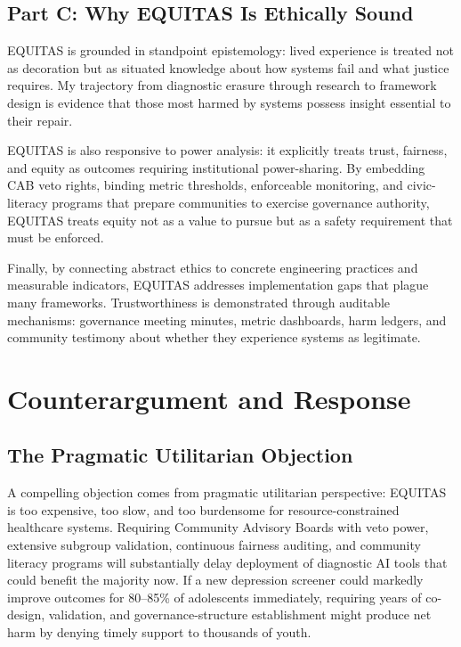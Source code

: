 \documentclass[12pt,a4paper]{article}
\begin{document}
\subsection{Part C: Why EQUITAS Is Ethically Sound}

EQUITAS is grounded in standpoint epistemology: lived experience is treated not as decoration but as situated knowledge about how systems fail and what justice requires.\cite{garcia_ed415} My trajectory from diagnostic erasure through research to framework design is evidence that those most harmed by systems possess insight essential to their repair.

EQUITAS is also responsive to power analysis: it explicitly treats trust, fairness, and equity as outcomes requiring institutional power-sharing.\cite{garcia_ed415} By embedding CAB veto rights, binding metric thresholds, enforceable monitoring, and civic-literacy programs that prepare communities to exercise governance authority, EQUITAS treats equity not as a value to pursue but as a safety requirement that must be enforced.\cite{lekadir2025}

Finally, by connecting abstract ethics to concrete engineering practices and measurable indicators, EQUITAS addresses implementation gaps that plague many frameworks. Trustworthiness is demonstrated through auditable mechanisms: governance meeting minutes, metric dashboards, harm ledgers, and community testimony about whether they experience systems as legitimate.\cite{sagona2025}

\section{Counterargument and Response}

\subsection{The Pragmatic Utilitarian Objection}

A compelling objection comes from pragmatic utilitarian perspective: EQUITAS is too expensive, too slow, and too burdensome for resource-constrained healthcare systems. Requiring Community Advisory Boards with veto power, extensive subgroup validation, continuous fairness auditing, and community literacy programs will substantially delay deployment of diagnostic AI tools that could benefit the majority now. If a new depression screener could markedly improve outcomes for 80--85\% of adolescents immediately, requiring years of co-design, validation, and governance-structure establishment might produce net harm by denying timely support to thousands of youth.\cite{garcia_ed415}
\end{document}
